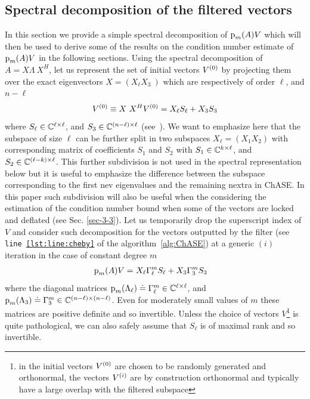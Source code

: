 \subsection{Spectral decomposition of the filtered vectors}
\label{sec-2-4}
In this section we provide a simple spectral decomposition of ${\textrm p}_{m} (A) V$ which will then be used to derive some of the results on the condition number estimate of ${\textrm p}_{m} (A) V$ in the following sections.
Using the spectral decomposition of $A = X \Lambda\ X^H$, let us represent the set of
initial vectors $V^{(0)}$ by projecting them over the exact eigenvectors $X =
\left(X_\ell X_3\ \right)$ which are respectively of order $\ell$, and $n-\ell$
\begin{equation*}
V^{(0)} \equiv X\ X^H V^{(0)} = X_\ell S_\ell + X_3 S_3
\end{equation*}
where $S_\ell \in \mathbb{C}^{\ell\times\ell}$, and $S_3 \in \mathbb{C}^{(n-\ell)\times\ell}$ (see~\cite{Stewart:2001id}). We want to emphasize here that the subspace of size $\ell$ can be further split in two subspaces $X_\ell = \left(X_1 X_2\right)$  with corresponding matrix of coefficients $S_1$ and $S_2$ with $S_1 \in \mathbb{C}^{k\times\ell}$, and $S_2 \in \mathbb{C}^{(\ell-k)\times\ell}$. This further subdivision is not used in the spectral representation below but it is useful to emphasize the difference between the subspace corresponding to the first \textsf{nev} eigenvalues and the remaining \textsf{nextra} in ChASE. In this paper such subdivision will also be useful when the considering the estimation of the condition number bound when some of the vectors are locked and deflated (see Sec. \ref{sec-3-3}).
Let us temporarily drop the superscript index of $V$ and consider such
decomposition for the vectors outputted by the filter (see {\tt
  line~\ref{lst:line:cheby}} of the algorithm~\ref{alg:ChASE}) at a generic $(i)$ iteration in the case of constant degree $m$
\begin{eqnarray}
\label{eq-2-2-1}
\pl (A) V = &\ 
X_\ell \Gamma_\ell^m S_\ell + X_3 \Gamma_3^m S_3
\end{eqnarray}
where the diagonal matrices ${\textrm p}_{m} (\Lambda_\ell) \doteq \Gamma_\ell^m \in \mathbb{C}^{\ell\times \ell}$, and ${\textrm p}_{m} (\Lambda_3) \doteq \Gamma_3^m \in \mathbb{C}^{(n-\ell)\times(n-\ell)}$. Even for moderately
small values of $m$ these matrices are positive definite and so
invertible. Unless the choice of vectors $V$\footnote{in \csi the initial vectors $V^{(0)}$ are chosen to be randomly generated and orthonormal, the vectors $V^{(i)}$ are by construction orthonormal and typically have a large overlap with the filtered subspace} is
quite pathological, we can also safely assume that $S_\ell$ is of maximal rank and so invertible. 

